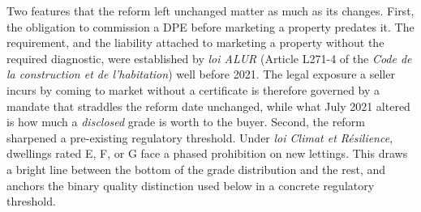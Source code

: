 Two features that the reform left unchanged matter as much as its changes. First, the obligation to
commission a DPE before marketing a property predates it. The requirement, and the liability
attached to marketing a property without the required diagnostic, were established by \emph{loi
ALUR} (Article L271-4 of the \emph{Code de la construction et de l'habitation}) well before 2021.
The legal exposure a seller incurs by coming to market without a certificate is therefore governed
by a mandate that straddles the reform date unchanged, while what July 2021 altered is how much a
\emph{disclosed} grade is worth to the buyer. Second, the reform sharpened a pre-existing
regulatory threshold. Under \emph{loi Climat et R\'esilience}, dwellings
rated E, F, or G face a phased prohibition on new lettings. This draws a bright line between the
bottom of the grade distribution and the rest, and anchors the binary quality distinction used below
in a concrete regulatory threshold.
